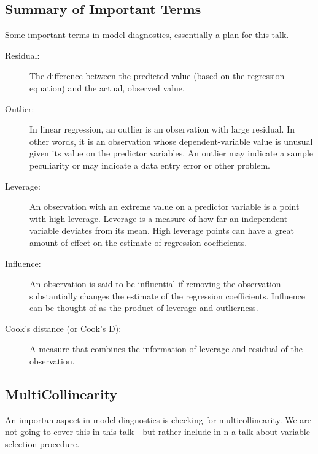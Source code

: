 \documentclass[residuals.tex]{subfiles}
\begin{document}
\newpage
\subsection*{Summary of Important Terms}
Some important terms in model diagnostics, essentially a plan for this talk.
\begin{description}
	\item[Residual: ] The difference between the predicted value (based on the regression equation) and the actual, observed value.
	\item[Outlier:]  In linear regression, an outlier is an observation with large residual.  In other words, it is an observation whose dependent-variable value is unusual given its value on the predictor variables.  An outlier may indicate a sample peculiarity or may indicate a data entry error or other problem. 
	\item[Leverage:]  An observation with an extreme value on a predictor variable is a point with high leverage.  Leverage is a measure of how far an independent variable deviates from its mean.  High leverage points can have a great amount of effect on the estimate of regression coefficients. 
	\item[Influence:]  An observation is said to be influential if removing the observation substantially changes the estimate of the regression coefficients.  Influence can be thought of as the product of leverage and outlierness.  
	\item[Cook's distance (or Cook's D):] A measure that combines the information of leverage and residual of the observation.  
\end{description}

\subsection*{MultiCollinearity}

An importan aspect in model diagnostics is checking for multicollinearity. We are not going to cover this in this talk - but rather include in n a talk about variable selection procedure.
\newpage
\end{document}
